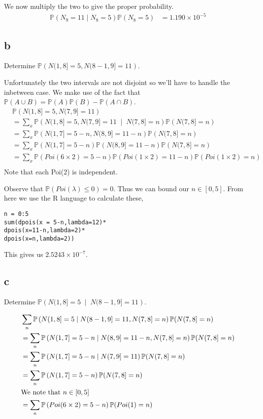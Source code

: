 \documentclass{article}
\newcommand{\prob}{\mathbb{P}}
\begin{document}
We now multiply the two to give the proper probability.
\begin{align*}
    \prob(N_9 = 11 \;|\; N_8 = 5) \prob(N_8 = 5)
    &= 1.190 \times 10^{-5}
\end{align*}

\subsection{b}
Determine $\prob\left(N(1, 8] = 5, N(8 - 1, 9] = 11\right)$.

Unfortunately the two intervals are not disjoint so we'll have to handle the
inbetween case. We make use of the fact that
$\prob(A \cup B) = \prob(A)\prob(B) - \prob(A \cap B)$.
\begin{align*}
    &\prob\left(N(1, 8] = 5, N(7, 9] = 11\right) \\
    &= \sum_x \prob\left(N(1, 8] = 5, N(7, 9] = 11 \;\middle|\; N(7, 8] = n\right) \prob\left(N(7, 8] = n\right) \\
    &= \sum_x \prob\left(N(1, 7] = 5 - n, N(8, 9] = 11 - n\right) \prob\left(N(7, 8] = n\right) \\
    &= \sum_x \prob\left(N(1, 7] = 5 - n\right)
    \prob\left(N(8, 9] = 11 - n\right) \prob\left(N(7, 8] = n\right) \\
    &= \sum_x \prob\left(Poi(6 \times 2) = 5 - n\right)
    \prob\left(Poi(1 \times 2) = 11 - n\right) \prob\left(Poi(1 \times 2) = n\right) \\
\end{align*}
Note that each Poi(2) is independent.

Observe that $\prob(Poi(\lambda) \leq 0) = 0$. Thus we can bound our 
$n \in [0,5]$. From here we use the R language to calculate these,
\begin{verbatim}
n = 0:5
sum(dpois(x = 5-n,lambda=12)*
dpois(x=11-n,lambda=2)*
dpois(x=n,lambda=2))
\end{verbatim}

This gives us $2.5243 \times 10^{-7}$.

\subsection{c}
Determine $\prob\left(N(1, 8] = 5 \;\middle|\; N(8 - 1, 9] = 11\right)$.

\begin{align*}
    &\sum_n \prob\left(N(1, 8] = 5 \;\middle|\; N(8 - 1, 9] = 11, N(7, 8] = n\right)
    \prob(N(7, 8] = n) \\
    &= \sum_n \prob\left(N(1, 7] = 5-n \;\middle|\; N(8, 9] = 11-n, N(7, 8] = n\right)
    \prob(N(7, 8] = n) \\
    &= \sum_n \prob\left(N(1, 7] = 5-n \;\middle|\; N(7, 9] = 11\right)
    \prob(N(7, 8] = n) \\
    &= \sum_n \prob\left(N(1, 7] = 5-n\right)\prob(N(7, 8] = n) \\
    &\text{We note that $n \in [0,5]$} \\
    &= \sum_n \prob\left(Poi(6 \times 2) = 5-n\right)\prob(Poi(1 \time 2) = n) \\
\end{align*}
\end{document}
